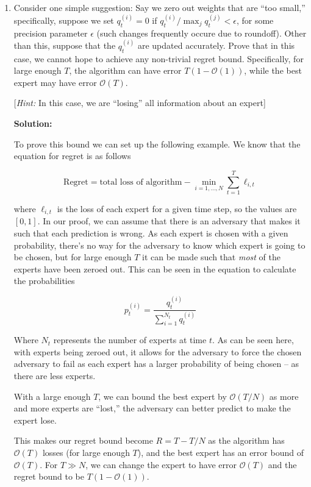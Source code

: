 \documentclass[12pt]{article}
\newcommand{\BigO}[1]{\mathcal{O}\left( #1 \right)}
\begin{document}
\begin{enumerate}
\begin{enumerate}
  \item Consider one simple suggestion: Say we zero out weights that are ``too small,'' specifically, suppose we set $q_{t}^{(i)} = 0$ if $q_{t}^{(i)}/\max_{j}q_{t}^{(j)} < \epsilon$, for some precision parameter $\epsilon$ (such changes frequently occure due to roundoff). Other than this, suppose that the $q_{t}^{(i)}$ are updated accurately. Prove that in this case, we cannot hope to achieve any non-trivial regret bound. Specifically, for large enough $T$, the algorithm can have error $T(1 - \BigO{1})$, while the best expert may have error $\BigO{T}$.

[{\em Hint:} In this case, we are ``losing'' all information about an expert]

      {\bf Solution:}

To prove this bound we can set up the following example. We know that the equation for regret is as follows

\[
\text{Regret} = \text{total loss of algorithm} - \min_{i=1, \ldots, N}\sum_{t=1}^{T}\ell_{i,t}
\]

where $\ell_{i,t}$ is the loss of each expert for a given time step, so the values are $[0, 1]$. In our proof, we can assume that there is an adversary that makes it such that each prediction is wrong. As each expert is chosen with a given probability, there's no way for the adversary to know which expert is going to be chosen, but for large enough $T$ it can be made such that {\em most} of the experts have been zeroed out. This can be seen in the equation to calculate the probabilities

\[
    p_{t}^{(i)} = \frac{q_{t}^{(i)}}{\sum_{i=1}^{N_{t}} q_{t}^{(i)}}
\]


Where $N_{t}$ represents the number of experts at time $t$. As can be seen here, with experts being zeroed out, it allows for the adversary to force the chosen adversary to fail as each expert has a larger probability of being chosen -- as there are less experts.

With a large enough $T$, we can bound the best expert by $\BigO{T/N}$ as more and more experts are ``lost,'' the adversary can better predict to make the expert lose.

This makes our regret bound become $R = T - T/N$ as the algorithm has $\BigO{T}$ losses (for large enough $T$), and the best expert has an error bound of $\BigO{T}$. For $T \gg N$, we can change the expert to have error $\BigO{T}$ and the regret bound to be $T(1 - \BigO{1})$.


\end{enumerate}
\end{enumerate}
\end{document}
